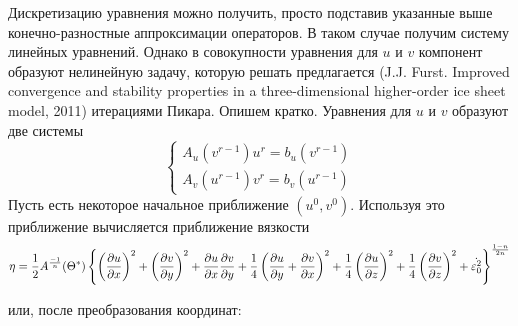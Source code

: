 Дискретизацию уравнения можно получить, просто подставив указанные
выше конечно-разностные аппроксимации операторов. В таком случае
получим систему линейных уравнений. Однако в совокупности уравнения
для $u$ и $v$ компонент образуют нелинейную задачу, которую решать
предлагается (J.J. Furst. Improved convergence and stability properties in a
three-dimensional higher-order ice sheet model, 2011) итерациями
Пикара. Опишем кратко.
Уравнения для $u$ и $v$ образуют две системы
\begin{equation*}
    \begin{cases}
        A_u(v^{r-1}) u^{r} = b_{u}(v^{r-1})
        \\
        A_v(u^{r-1}) v^{r} = b_{v}(u^{r-1})
    \end{cases}
\end{equation*}
Пусть есть некоторое начальное приближение $(u^0, v^0)$. Используя
это приближение вычисляется приближение вязкости
\begin{equation*}
    \eta
    =
    \frac{1}{2}
    A^{\frac{-1}{n}}(\Theta^{*})
    \left\{
    \left(
    \frac
    {\partial u}
    {\partial x}
    \right)^2
    +
    \left(
    \frac
    {\partial v}
    {\partial y}
    \right)^2
    +
    \frac
    {\partial u}
    {\partial x}
    \frac
    {\partial v}
    {\partial y}
    +
    \frac
    {1}
    {4}
    \left(
    \frac
    {\partial u}
    {\partial y}
    +
    \frac
    {\partial v}
    {\partial x}
    \right)^2
    +
    \frac
    {1}
    {4}
    \left(
    \frac
    {\partial u}
    {\partial z}
    \right)^2
    +
    \frac
    {1}
    {4}
    \left(
    \frac
    {\partial v}
    {\partial z}
    \right)^2
    +
    \dot{\varepsilon^2_0}
    \right\}^{\frac{1-n}{2n}}
\end{equation*}

или, после преобразования координат:

